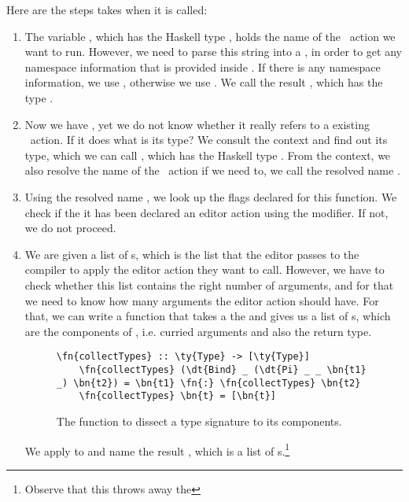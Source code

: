 Here are the steps  takes when it is called:
\begin{enumerate}
  \item The variable , which has the Haskell type ,
    holds the name of the \Elab\ action we want to run. However, we need
    to parse this string into a , in order to get any namespace
    information that is provided inside .
    If there is any namespace information, we use , otherwise we use
    .  We call the result , which has the type .
  \item Now we have , yet we do not know whether it really refers to a
    existing \Elab\ action. If it does what is its type?
    We consult the context and find out its type, which we can call , which
    has the Haskell type . From the context, we also resolve the
    name of the \Elab\ action if we need to, we call the resolved name .
  \item Using the resolved name , we look up the flags declared for this function.
    We check if the it has been declared an editor action using the
     modifier.  If not, we do not proceed.
  \item We are given a list of s, which is the list that the editor
    passes to the compiler to apply the editor action they want to call.
    However, we have to check whether this list contains the right number of
    arguments, and for that we need to know how many arguments the editor action should have.
    For that, we can write a function  that takes a the
      and gives us a list of s, which are the
    components of , i.e.  curried arguments and also the return type.
    \begin{figure}[H]
    \caption{The function  to dissect a type signature to its components.}
    \label{code:collectTypes}
    \begin{Verbatim}[framesep=2mm, label=\footnotesize{\normalfont{Haskell}}, labelposition=topline]
    \fn{collectTypes} :: \ty{Type} -> [\ty{Type}]
    \fn{collectTypes} (\dt{Bind} _ (\dt{Pi} _ _ \bn{t1} _) \bn{t2}) = \bn{t1} \fn{:} \fn{collectTypes} \bn{t2}
    \fn{collectTypes} \bn{t} = [\bn{t}]
    \end{Verbatim}
    \end{figure}
    We apply  to  and name the result ,
    which is a list of s.\footnote{Observe that this throws away the
}
\end{enumerate}
